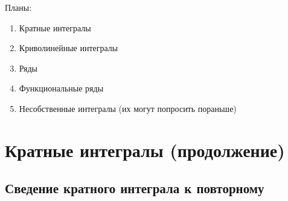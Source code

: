 Планы:
\begin{enumerate}
	\item Кратные интегралы
	\item Криволинейные интегралы
	\item Ряды
	\item Функциональные ряды
	\item Несобственные интегралы (их могут попросить пораньше)
\end{enumerate}

\setcounter{chapter}{2}
\chapter{Кратные интегралы (продолжение)}
\setcounter{section}{4}
\section[Сведение крат. интеграла к повторному]{Сведение кратного интеграла к повторному}

